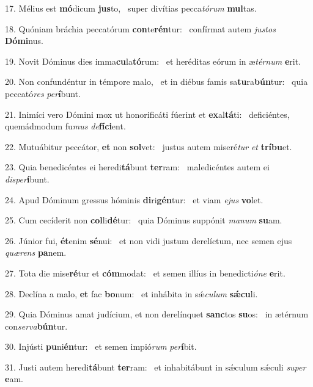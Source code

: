 17. Mélius est \textbf{mó}dicum \textbf{jus}to, \ast\  super divítias pecca\textit{tó}\textit{rum} \textbf{mul}tas.\

18. Quóniam bráchia peccatórum \textbf{con}te\textbf{rén}tur: \ast\  confírmat autem \textit{jus}\textit{tos} \textbf{Dó}\textbf{mi}nus.\

19. Novit Dóminus dies imma\textbf{cu}la\textbf{tó}rum: \ast\  et heréditas eórum in æ\textit{tér}\textit{num} \textbf{e}rit.\

20. Non confundéntur in témpore malo, \dag\  et in diébus famis sa\textbf{tu}ra\textbf{bún}tur: \ast\  quia peccató\textit{res} \textit{per}\textbf{í}bunt.\

21. Inimíci vero Dómini mox ut honorificáti fúerint et \textbf{ex}al\textbf{tá}ti: \ast\  deficiéntes, quemádmodum fu\textit{mus} \textit{de}\textbf{fí}\textbf{ci}ent.\

22. Mutuábitur peccátor, \textbf{et} non \textbf{sol}vet: \ast\  justus autem miseré\textit{tur} \textit{et} \textbf{trí}\textbf{bu}et.\

23. Quia benedicéntes ei heredi\textbf{tá}bunt \textbf{ter}ram: \ast\  maledicéntes autem ei \textit{dis}\textit{per}\textbf{í}bunt.\

24. Apud Dóminum gressus hóminis \textbf{di}ri\textbf{gén}tur: \ast\  et viam \textit{e}\textit{jus} \textbf{vo}let.\

25. Cum cecíderit non \textbf{col}li\textbf{dé}tur: \ast\  quia Dóminus suppónit \textit{ma}\textit{num} \textbf{su}am.\

26. Júnior fui, \textbf{ét}enim \textbf{sé}nui: \ast\  et non vidi justum derelíctum, nec semen ejus \textit{quæ}\textit{rens} \textbf{pa}nem.\

27. Tota die mise\textbf{ré}tur et \textbf{cóm}modat: \ast\  et semen illíus in benedicti\textit{ó}\textit{ne} \textbf{e}rit.\

28. Declína a malo, \textbf{et} fac \textbf{bo}num: \ast\  et inhábita in sǽ\textit{cu}\textit{lum} \textbf{sǽ}\textbf{cu}li.\

29. Quia Dóminus amat judícium, et non derelínquet \textbf{sanc}tos \textbf{su}os: \ast\  in ætérnum con\textit{ser}\textit{va}\textbf{bún}tur.\

30. Injústi \textbf{pu}ni\textbf{én}tur: \ast\  et semen impió\textit{rum} \textit{per}\textbf{í}bit.\

31. Justi autem heredi\textbf{tá}bunt \textbf{ter}ram: \ast\  et inhabitábunt in sǽculum sǽculi \textit{su}\textit{per} \textbf{e}am.\

